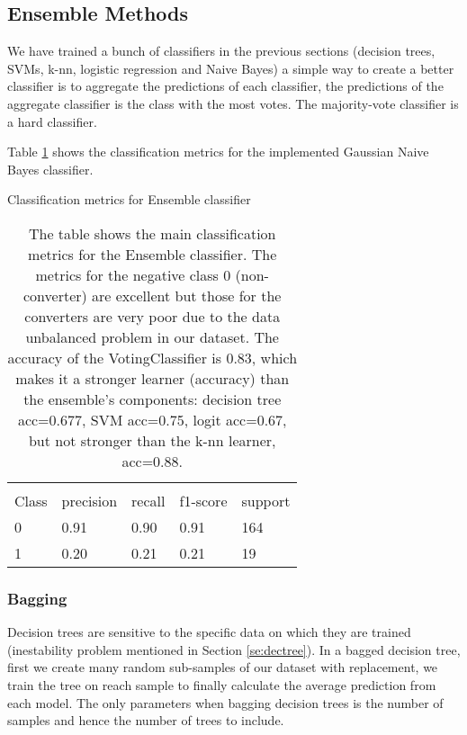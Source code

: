 \documentclass[11pt]{article}
\begin{document}
\subsection{Ensemble Methods}
\label{se:resensemble}

We have trained a bunch of classifiers in the previous sections (decision trees, SVMs, k-nn, logistic regression and Naive Bayes) a simple way to create a better classifier is to aggregate the predictions of each classifier, the predictions of the aggregate classifier is the class with the most votes. The majority-vote classifier is a hard classifier. 


Table \ref{tab:ensemble} shows the classification metrics for the implemented Gaussian Naive Bayes classifier.
\begin{table}[H]
\caption{Classification metrics for Ensemble classifier} \label{tab:ensemble} 
\begin{center} 
\begin{tabular}{lllll}
\hline
\multicolumn{1}{c}{} \\
Class & precision & recall & f1-score & support     \\
\hline
0 & 0.91  &    0.90   &   0.91   &    164 \\
1 & 0.20  &    0.21   &   0.21   &    19 \\
\hline
\end{tabular}
\caption{The table shows the main classification metrics for the Ensemble classifier. The metrics for the negative class 0 (non-converter) are excellent but those for the converters are very poor due to the data unbalanced problem in our dataset.
The accuracy of the VotingClassifier is 0.83, which makes it a stronger learner (accuracy) than the ensemble's components: decision tree acc=0.677, SVM acc=0.75, logit acc=0.67, but not stronger than the k-nn learner, acc=0.88.
}
\end{center}
\end{table}


\subsubsection{Bagging}
\label{se:resrf}

Decision trees are sensitive to the specific data on which they are trained (inestability problem mentioned in Section \ref{se:dectree}). In a bagged decision tree, first we create many random sub-samples of our dataset with replacement, we train the tree on reach sample to finally calculate the average prediction from each model. The only parameters when bagging decision trees is the number of samples and hence the number of trees to include.
\end{document}
